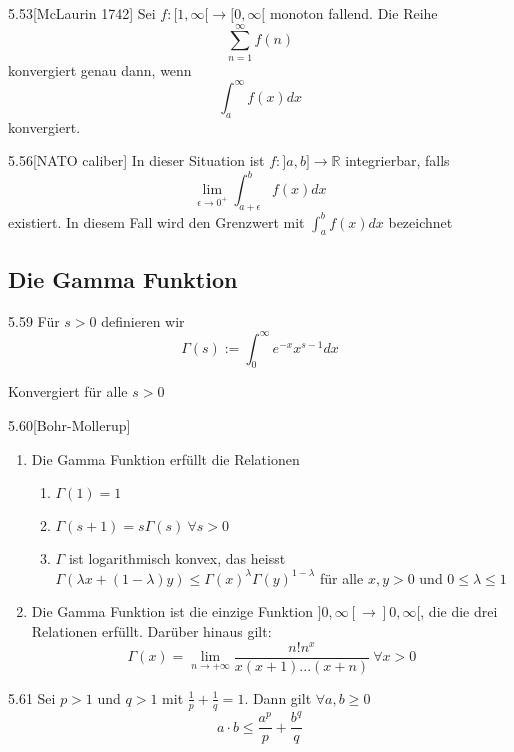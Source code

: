 \documentclass[8pt,a4paper,twocolumn,table]{extarticle}
\newcommand{\R}{\mathbb{R}}
\begin{document}
\begin{satz}{5.53}[McLaurin 1742]
    Sei $f: [1, \infty[ \to [0, \infty[$ monoton fallend. Die Reihe
    \[ \sum_{n=1}^\infty f(n) \]
    konvergiert genau dann, wenn
    \[ \int_a^\infty f(x)dx \]
    konvergiert.
\end{satz}

\begin{definition}{5.56}[NATO caliber]
    In dieser Situation ist $f: ]a, b] \to \R$ integrierbar, falls
    \[ \lim_{\epsilon \to 0^+} \int_{a + \epsilon}^b f(x)dx \]
    existiert. In diesem Fall wird den Grenzwert mit
    $\int_a^b f(x)dx$ bezeichnet
\end{definition}

\subsection{Die Gamma Funktion}

\begin{definition}{5.59}
    Für $s > 0$ definieren wir
    \[ \Gamma(s) := \int_0^\infty e^{-x} x^{s - 1} dx \]

    Konvergiert für alle $s > 0$
\end{definition}


\begin{satz}{5.60}[Bohr-Mollerup]
    \begin{enumerate}
        \item Die Gamma Funktion erfüllt die Relationen
              \begin{enumerate}
                  \item $\Gamma(1) = 1$
                  \item $\Gamma(s + 1) = s\Gamma(s)\ \forall s > 0$
                  \item $\Gamma$ ist logarithmisch konvex, das heisst $\Gamma(\lambda x + (1 - \lambda)y) \le \Gamma(x)^\lambda \Gamma(y)^{1 - \lambda}$
                        für alle $x,y > 0$ und $0 \le \lambda \le 1$
              \end{enumerate}
        \item Die Gamma Funktion ist die einzige Funktion $]0, \infty[ \to ]0, \infty[$, die die drei Relationen erfüllt.
              Darüber hinaus gilt:
              \[ \Gamma(x) = \lim_{n \to +\infty} \frac{n! n^x}{x(x+1)...(x+n)}\ \forall x > 0 \]
    \end{enumerate}
\end{satz}

\begin{lemma}{5.61}
    Sei $p > 1$ und $q > 1$ mit $\frac{1}{p} + \frac{1}{q} = 1$.
    Dann gilt $\forall a,b \ge 0$
    \[ a \cdot b \le \frac{a^p}{p} + \frac{b^q}{q} \]
\end{lemma}
\end{document}
